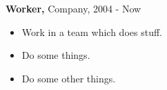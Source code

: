 {{\bf Worker,} Company}, 2004 - Now
\begin{itemize}
\item Work in a team which does stuff.
\item Do some things.
\item Do some other things.
\end{itemize}